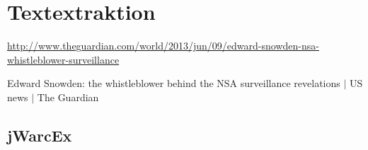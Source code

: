 \documentclass[a4paper,12pt,titlepage=false]{scrreprt}
\begin{document}
\chapter{Textextraktion}


\scriptsize
\vspace{.1cm}
\url{http://www.theguardian.com/world/2013/jun/09/edward-snowden-nsa-whistleblower-surveillance}

\scriptsize
Edward Snowden: the whistleblower behind the NSA surveillance revelations $|$ US news $|$ The Guardian

\section{jWarcEx}
\end{document}

